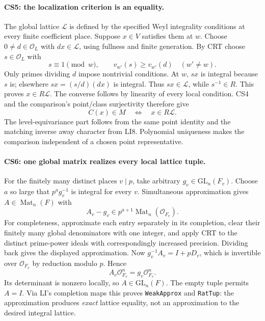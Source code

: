 \paragraph{CS5: the localization criterion is an equality.}
The global lattice $\mathcal L$ is defined by the specified Weyl
integrality conditions at every finite coefficient place. Suppose
$x\in V$ satisfies them at $w$. Choose $0\ne d\in\mathcal O_L$
with $dx\in\mathcal L$, using fullness and finite generation.
By CRT choose $s\in\mathcal O_L$ with
\[
 s\equiv1\pmod w,\qquad
 v_{w'}(s)\ge v_{w'}(d)\quad(w'\ne w).                 \tag{CS.7}
\]
Only primes dividing $d$ impose nontrivial conditions. At $w$, $sx$
is integral because $s$ is; elsewhere $sx=(s/d)(dx)$ is integral.
Thus $sx\in\mathcal L$, while $s^{-1}\in R$. This proves
$x\in R\mathcal L$. The converse follows by linearity of every
local condition. CS4 and the comparison's point/class surjectivity
therefore give
\[
 \boxed{\ C(x)\in M\quad\Longleftrightarrow\quad
                         x\in R\mathcal L.\ }          \tag{CS.8}
\]
The level-equivariance part follows from the same point identity and
the matching inverse away character from LI8. Polynomial uniqueness
makes the comparison independent of a chosen point representative.

\paragraph{CS6: one global matrix realizes every local lattice tuple.}
For the finitely many distinct places $v\mid p$, take arbitrary
$g_v\in\mathrm{GL}_n(F_v)$. Choose $a$ so large that
$p^a g_v^{-1}$ is integral for every $v$. Simultaneous approximation
gives $A\in\operatorname{Mat}_n(F)$ with
\[
 A_v-g_v\in p^{a+1}\operatorname{Mat}_n(\mathcal O_{F_v}).
\]
For completeness, approximate each entry separately in its completion,
clear their finitely many global denominators with one integer, and
apply CRT to the distinct prime-power ideals with correspondingly
increased precision. Dividing back gives the displayed approximation.
Now $g_v^{-1}A_v=I+pD_v$, which is invertible over
$\mathcal O_{F_v}$ by reduction modulo $p$. Hence
\[
 A_v\mathcal O_{F_v}^{n}=g_v\mathcal O_{F_v}^{n}.    \tag{CS.9}
\]
Its determinant is nonzero locally, so $A\in\mathrm{GL}_n(F)$.
The empty tuple permits $A=I$. Via LI's completion maps this proves
\texttt{WeakApprox} and \texttt{RatTup}: the approximation produces
\emph{exact} lattice equality, not an approximation to the desired
integral lattice.

